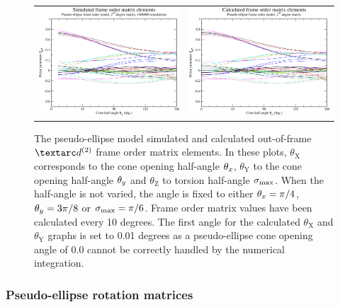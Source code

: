 \begin{figure}
\begin{tabular}{@{}cc@{}}
    \\[-5pt]
    \includegraphics[width=.5\textwidth]{images/frame_order_matrix/Sijkl_pseudo-ellipse_out_of_frame_theta_z_ens1000000.eps} &
    \includegraphics[width=.5\textwidth]{images/frame_order_matrix/Sijkl_pseudo-ellipse_out_of_frame_theta_z_calc.eps} \\
  \end{tabular}
  \caption[Pseudo-ellipse simulated and calculated out-of-frame Daeg$^{(2)}$ elements.]{
    The pseudo-ellipse model simulated and calculated out-of-frame $\FOtwo$ frame order matrix elements.
    In these plots, $\theta_\textrm{X}$ corresponds to the cone opening half-angle $\theta_x$, $\theta_\textrm{Y}$ to the cone opening half-angle $\theta_y$ and $\theta_\textrm{Z}$ to torsion half-angle $\sigma_\textrm{max}$.
    When the half-angle is not varied, the angle is fixed to either $\theta_x = \pi/4$, $\theta_y = 3\pi/8$ or $\sigma_\textrm{max} = \pi/6$.
    Frame order matrix values have been calculated every 10 degrees.
    The first angle for the calculated $\theta_\textrm{X}$ and $\theta_\textrm{Y}$ graphs is set to 0.01 degrees as a pseudo-ellipse cone opening angle of 0.0 cannot be correctly handled by the numerical integration.
  }
  \label{fig: simulated and calculated out-of-frame 2nd degree pseudo-ellipse frame order}
\end{figure}



\subsubsection{Pseudo-ellipse rotation matrices}

